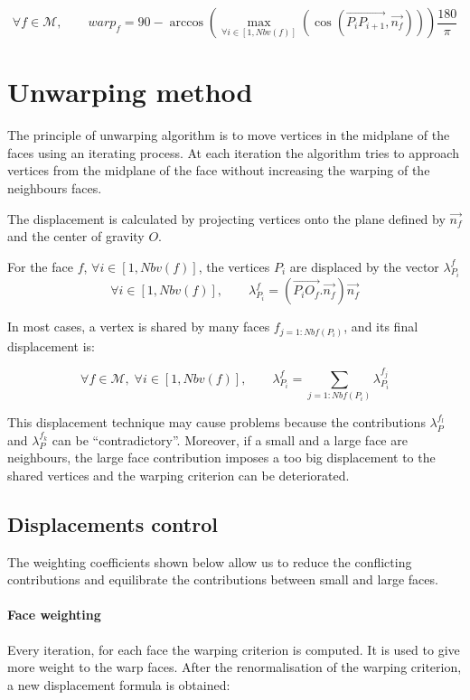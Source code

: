 $$\forall f \in \mathcal{M}, \qquad warp_{f} = 90 -
\arccos\left(\max_{\forall i\in [1,Nbv(f)]}\left(\cos(
\overrightarrow{P_{i}P_{i+1}},\overrightarrow{n_{f}})
\right)\right)\frac{180}{\pi}$$

\section*{Unwarping method\label{sec:unwarping_method}}
The principle of unwarping algorithm is to move vertices in the midplane of the
faces using an iterating process. At each iteration the algorithm tries to
approach vertices from the midplane of the face without increasing the warping
of the neighbours faces.

The displacement is calculated by projecting vertices onto
the plane defined by $\overrightarrow{n_{f}}$ and the center of gravity $O$.

For the face $f$, $\forall i \in [1,Nbv(f)]$, the vertices $P_{i}$ are displaced
by the vector $\lambda^{f}_{P_{i}}$
$$\forall i \in [1,Nbv(f)], \qquad \lambda_{P_{i}}^{f}
= (\overrightarrow{P_{i}O_{f}}.\overrightarrow{n_{f}})
\overrightarrow{n_{f}}$$

In most cases, a vertex is shared by many faces $f_{j=1:Nbf(P_{i})}$, and its final
displacement is:

$$\forall f \in \mathcal{M}, \; \forall i \in [1,Nbv(f)], \qquad
 \lambda_{P_{i}}^{f}=\sum_{j=1:Nbf(P_{i})}\lambda^{f_{j}}_{P_{i}}$$

This displacement technique may cause problems because the contributions
$\lambda^{f_{l}}_{P}$ and $\lambda^{f_{k}}_{P}$ can be ``contradictory''.
Moreover, if a small and a large face are neighbours, the large face contribution
imposes a too big displacement to the shared vertices and the warping criterion
can be deteriorated.

\subsection*{Displacements control\label{sec:unwarping_mvt}}
The weighting coefficients shown below allow us to reduce the conflicting
contributions and equilibrate the contributions between small and large faces.
\paragraph*{Face weighting}
Every iteration, for each face the warping criterion is computed.
It is used to give more weight to the warp faces. After the renormalisation of the
warping criterion, a new displacement formula is obtained:

